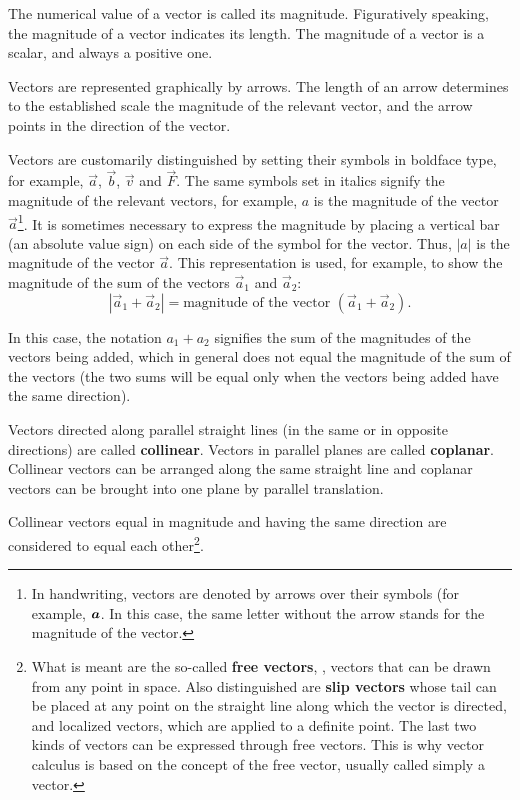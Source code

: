 The numerical value of a vector is called its magnitude. Figuratively speaking, the magnitude of a vector indicates its length. The magnitude of a vector is a scalar, and always a positive one.

Vectors are represented graphically by arrows. The length of an arrow determines to the established scale the magnitude of the relevant vector, and the arrow points in the direction of the vector.

Vectors are customarily distinguished by setting their symbols in boldface type, for example, $\vec{a}$, $\vec{b}$, $\vec{v}$ and $\vec{F}$. The same symbols set in italics signify the magnitude of the relevant vectors, for example, $a$ is the magnitude of the vector $\vec{a}$\footnote{In handwriting, vectors are denoted by arrows over their symbols (for example, $\oldvec{a}$. In this case, the same letter without the arrow stands for the magnitude of the vector.}. It is sometimes necessary to express the magnitude by placing a vertical bar (an absolute value sign) on each side of the symbol for the vector. Thus, $|a|$ is the magnitude of the vector $\vec{a}$. This representation is used, for example, to show the magnitude of the sum of the vectors $\vec{a}_1$ and $\vec{a}_2$:
\begin{equation}\label{eq:1_1}
	|\vec{a}_1 + \vec{a}_2| = \text{magnitude of the vector } (\vec{a}_1 + \vec{a}_2).
\end{equation}

\noindent
In this case, the notation $a_1+a_2$ signifies the sum of the magnitudes of the vectors being added, which in general does not equal the magnitude of the sum of the vectors (the two sums will be equal only when the vectors being added have the same direction).

Vectors directed along parallel straight lines (in the same or in opposite directions) are called \textbf{collinear}. Vectors in parallel planes are called \textbf{coplanar}. Collinear vectors can be arranged along the same straight line and coplanar vectors can be brought into one plane by parallel translation.

Collinear vectors equal in magnitude and having the same direction are considered to equal each other\footnote{What is meant are the so-called \textbf{free vectors}, \ie, vectors that can be drawn from any point in space. Also distinguished are \textbf{slip vectors} whose tail can be placed at any point on the straight line along which the vector is directed, and localized vectors, which are applied to a definite point. The last two kinds of vectors can be expressed through free vectors. This is why vector calculus is based on the concept of the free vector, usually called simply a vector.}.

